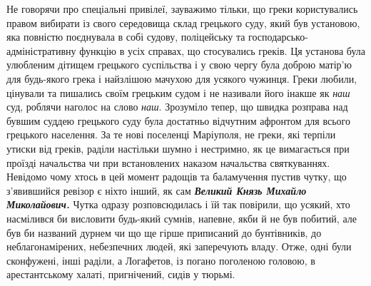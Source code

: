 \documentclass[a4paper,20pt]{report}
\begin{document}
Не говорячи про спеціальні привілеї, зауважимо тільки, що греки користувались
правом вибирати із свого середовища склад грецького суду, який був установою,
яка повністю поєднувала в собі судову, поліцейську та
господарсько-адміністративну функцію в усіх справах, що стосувались греків. Ця
установа була улюбленим дітищем грецького суспільства і у свою чергу була
доброю матір'ю для будь-якого грека і найзлішою мачухою для усякого чужинця.
Греки любили, цінували та пишались своїм грецьким судом і не називали його
інакше як \emph{наш} суд, роблячи наголос на слово \emph{наш}. Зрозуміло тепер,
що швидка розправа над бувшим суддею грецького суду була достатньо відчутним
афронтом для всього грецького населення. За те нові поселенці Маріуполя, не
греки, які терпіли утиски від греків, раділи настільки шумно і нестримно, як це
вимагається при проїзді начальства чи при встановлених наказом начальства
святкуваннях. Невідомо чому хтось в цей момент радощів та баламучення пустив
чутку, що з'явившийся ревізор є ніхто інший, як сам \textbf{\emph{Великий Князь
Михайло Миколайович.}} Чутка одразу розповсюдилась і їй так повірили, що
усякий, хто насмілився би висловити будь-який сумнів, напевне, якби й не був
побитий, але був би названий дурнем чи що ще гірше приписаний до бунтівників,
до неблагонамірених, небезпечних людей, які заперечують владу. Отже, одні були
сконфужені, інші раділи, а Логафетов, із погано поголеною головою, в
арестантському халаті, пригнічений, сидів у тюрьмі.

\end{document}
